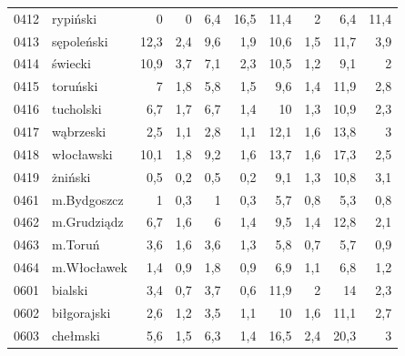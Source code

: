 \begin{center}
\begin{longtable}{lp{3cm}rrrrrrrr}
0412 & rypiński                & 0       & 0           & 6,4      & 16,5         & 11,4     & 2            & 6,4      & 11,4         \\
0413 & sępoleński              & 12,3    & 2,4         & 9,6      & 1,9          & 10,6     & 1,5          & 11,7     & 3,9          \\
0414 & świecki                 & 10,9    & 3,7         & 7,1      & 2,3          & 10,5     & 1,2          & 9,1      & 2            \\
0415 & toruński                & 7       & 1,8         & 5,8      & 1,5          & 9,6      & 1,4          & 11,9     & 2,8          \\
0416 & tucholski               & 6,7     & 1,7         & 6,7      & 1,4          & 10       & 1,3          & 10,9     & 2,3          \\
0417 & wąbrzeski               & 2,5     & 1,1         & 2,8      & 1,1          & 12,1     & 1,6          & 13,8     & 3            \\
0418 & włocławski              & 10,1    & 1,8         & 9,2      & 1,6          & 13,7     & 1,6          & 17,3     & 2,5          \\
0419 & żniński                 & 0,5     & 0,2         & 0,5      & 0,2          & 9,1      & 1,3          & 10,8     & 3,1          \\
0461 & m.Bydgoszcz             & 1       & 0,3         & 1        & 0,3          & 5,7      & 0,8          & 5,3      & 0,8          \\
0462 & m.Grudziądz             & 6,7     & 1,6         & 6        & 1,4          & 9,5      & 1,4          & 12,8     & 2,1          \\
0463 & m.Toruń                 & 3,6     & 1,6         & 3,6      & 1,3          & 5,8      & 0,7          & 5,7      & 0,9          \\
0464 & m.Włocławek             & 1,4     & 0,9         & 1,8      & 0,9          & 6,9      & 1,1          & 6,8      & 1,2          \\
0601 & bialski                 & 3,4     & 0,7         & 3,7      & 0,6          & 11,9     & 2            & 14       & 2,3          \\
0602 & biłgorajski             & 2,6     & 1,2         & 3,5      & 1,1          & 10       & 1,6          & 11,1     & 2,7          \\
0603 & chełmski                & 5,6     & 1,5         & 6,3      & 1,4          & 16,5     & 2,4          & 20,3     & 3            \\

\end{longtable}
\end{center}
